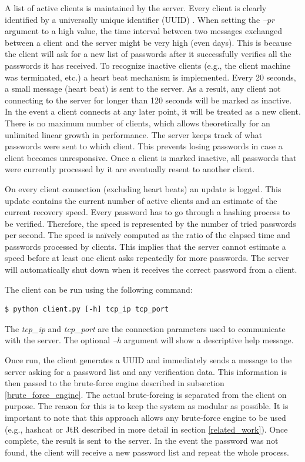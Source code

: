 \documentclass[11pt,oneside]{fithesis2}
\begin{document}
A list of active clients is maintained by the server. Every client is clearly identified by a universally unique identifier (UUID) \cite{rfc4122}. When setting the \textit{–pr} argument to a high value, the time interval between two messages exchanged between a client and the server might be very high (even days). This is because the client will ask for a new list of passwords after it successfully verifies all the passwords it has received. To recognize inactive clients (e.g., the client machine was terminated, etc.) a heart beat mechanism is implemented. Every 20 seconds, a small message (heart beat) is sent to the server. As a result, any client not connecting to the server for longer than 120 seconds will be marked as inactive. In the event a client connects at any later point, it will be treated as a new client. There is no maximum number of clients, which allows theoretically for an unlimited linear growth in performance. The server keeps track of what passwords were sent to which client. This prevents losing passwords in case a client becomes unresponsive. Once a client is marked inactive, all passwords that were currently processed by it are eventually resent to another client. 

On every client connection (excluding heart beats) an update is logged. This update contains the current number of active clients and an estimate of the current recovery speed. Every password has to go through a hashing process to be verified. Therefore, the speed is represented by the number of tried passwords per second. The speed is naïvely computed as the ratio of the elapsed time and passwords processed by clients. This implies that the server cannot estimate a speed before at least one client asks repeatedly for more passwords. The server will automatically shut down when it receives the correct password from a client.

The client can be run using the following command:
\begin{lstlisting}
$ python client.py [-h] tcp_ip tcp_port 
\end{lstlisting}

The \textit{tcp\_ip} and \textit{tcp\_port} are the connection parameters used to communicate with the server. The optional \textit{–h} argument will show a descriptive help message. 

Once run, the client generates a UUID and immediately sends a message to the server asking for a password list and any verification data. This information is then passed to the brute-force engine described in subsection \ref{brute_force_engine}. The actual brute-forcing is separated from the client on purpose. The reason for this is to keep the system as modular as possible. It is important to note that this approach allows any brute-force engine to be used (e.g., hashcat or JtR \cite{hashcat, jtr} described in more detail in section \ref{related_work}). Once complete, the result is sent to the server. In the event the password was not found, the client will receive a new password list and repeat the whole process.
\end{document}

